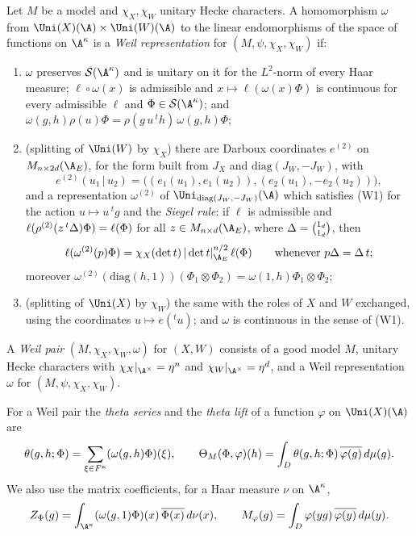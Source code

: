\begin{definition}\label{pf:tlift:weil}
Let $M$ be a model and $\chi_X,\chi_W$ unitary Hecke characters. A homomorphism $\omega$ from
$\Uni(X)(\A)\times\Uni(W)(\A)$ to the linear endomorphisms of the space of functions on $\A^\kappa$ is a
\emph{Weil representation} for $(M,\psi,\chi_X,\chi_W)$ if:
\begin{enumerate}[label=(W\arabic*),nosep]
\item $\omega$ preserves $\tliftS(\A^\kappa)$ and is unitary on it for the $L^2$-norm of every Haar measure;
  $\ell\circ\omega(x)$ is admissible and $x\mapsto\ell(\omega(x)\Phi)$ is continuous for every admissible $\ell$
  and $\Phi\in\tliftS(\A^\kappa)$; and $\omega(g,h)\rho(u)\Phi=\rho(g\,u\,{}^th)\,\omega(g,h)\Phi$;
\item (splitting of $\Uni(W)$ by $\chi_X$) there are Darboux coordinates $e^{(2)}$ on
  $M_{n\times2d}(\tliftAE)$, for the form built from $J_X$ and $\mathrm{diag}(J_W,-J_W)$, with
  \[e^{(2)}(u_1\,|\,u_2)=\bigl((e_1(u_1),e_1(u_2)),(e_2(u_1),-e_2(u_2))\bigr),\]
  and a representation
  $\omega^{(2)}$ of $\Uni_{\mathrm{diag}(J_W,-J_W)}(\A)$ which satisfies (W1) for the action $u\mapsto u\,{}^tg$
  and the \emph{Siegel rule}: if $\ell$ is admissible and $\ell(\rho^{(2)}(z\,{}^t\Delta)\Phi)=\ell(\Phi)$
  for all $z\in M_{n\times d}(\tliftAE)$, where $\Delta={1_d\choose 1_d}$, then
  \[
    \ell(\omega^{(2)}(p)\Phi)=\chi_X(\det t)\,|\det t|_{\tliftAE}^{n/2}\,\ell(\Phi)\qquad\text{whenever }p\tliftdia=\tliftdia\,t;
  \]
  moreover $\omega^{(2)}(\mathrm{diag}(h,1))(\Phi_1\otimes\Phi_2)=\omega(1,h)\Phi_1\otimes\Phi_2$;
\item (splitting of $\Uni(X)$ by $\chi_W$) the same with the roles of $X$ and $W$ exchanged, using the
  coordinates $u\mapsto e({}^tu)$; and $\omega$ is continuous in the sense of (W1).
\end{enumerate}
A \emph{Weil pair} $(M,\chi_X,\chi_W,\omega)$ for $(X,W)$ consists of a good model $M$, unitary Hecke
characters with $\chi_X|_{\A^\times}=\eta^n$ and $\chi_W|_{\A^\times}=\eta^d$, and a Weil representation $\omega$ for
$(M,\psi,\chi_X,\chi_W)$.
\end{definition}

For a Weil pair the \emph{theta series} and the \emph{theta lift} of a function $\varphi$ on
$\Uni(X)(\A)$ are
\begin{equation}\label{eq:tlift:theta}
  \theta(g,h;\Phi)=\sum_{\xi\in F^\kappa}(\omega(g,h)\Phi)(\xi),\qquad
  \Theta_M(\Phi,\varphi)(h)=\int_D\theta(g,h;\Phi)\,\overline{\varphi(g)}\,d\mu(g).
\end{equation}
We also use the matrix coefficients, for a Haar measure $\nu$ on $\A^\kappa$,
\begin{equation}\label{eq:tlift:coef}
  \tliftZ_\Phi(g)=\int_{\A^\kappa}(\omega(g,1)\Phi)(x)\,\overline{\Phi(x)}\,d\nu(x),\qquad
  \tliftM_\varphi(g)=\int_D\varphi(yg)\,\overline{\varphi(y)}\,d\mu(y).
\end{equation}


